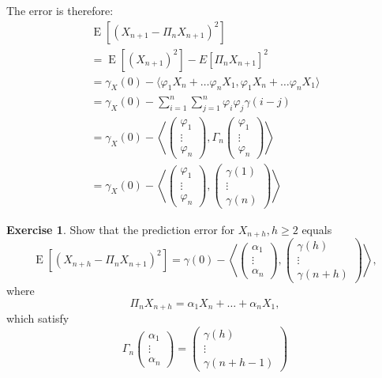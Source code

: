 \documentclass[12pt,a4paper, notitlepage]{book}
\theoremstyle{definition} %
\newtheorem{exercise}[definition]{Exercise}
\theoremstyle{plain} %
\DeclareMathOperator{\E}{E}
\begin{document}
The error is therefore:
\begin{align*}
 \E\left[(X_{n+1} - \Pi_n X_{n+1})^2\right]  \\ 
= \E\left[ (X_{n+1})^2\right] - E\left[\Pi_n X_{n+1}\right] ^2  \\ 
= \gamma_X (0) - \langle \varphi_1 X_n + \ldots \varphi _n X_1, \varphi _1 X_n + \ldots \varphi _n X_1 \rangle \\
= \gamma_X(0) - \sum_{i=1} ^n \sum_{j=1} ^n  \varphi_i \varphi_j \gamma(i-j)    \\
 = \gamma_X(0) - \left<  \left( \begin{array}{c} \varphi _1 \\ \vdots \\ \varphi _n \end{array}  \right) ,  \Gamma_n   \left( \begin{array}{c} \varphi _1 \\ \vdots \\ \varphi _n \end{array} \right) \right>  \\
 = \gamma_X(0) - \left<  \left( \begin{array}{c} \varphi _1 \\ \vdots \\ \varphi _n \end{array}  \right) ,     \left( \begin{array}{c} \gamma (1) \\ \vdots \\ \gamma(n) \end{array} \right) \right>  
\end{align*}

\begin{exercise}
Show that the prediction error for $X_{n+h}, h \geq 2$ equals 
\[ \E \left[ (X_{n+h}- \Pi_nX_{n+1})^2 \right]  = \gamma(0) - \left< \left( \begin{array} {c} \alpha _1 \\ \vdots \\ \alpha _n \end{array} \right) , \left( \begin{array} {c} \gamma(h) \\  \vdots \\ \gamma(n+h) \end{array} \right) \right> ,\]
where 
\[ \Pi_n X_{n+h} = \alpha_1 X_n + \dots + \alpha_n X_1, \]
which satisfy 
\[ \Gamma_n \left( \begin{array} {c} \alpha_1 \\ \vdots \\ \alpha _n \end{array} \right) 
 = \left( \begin{array} {c} \gamma(h) \\ \vdots \\ \gamma(n+h-1) \end{array} \right)  \]
\end{exercise}
\end{document}
